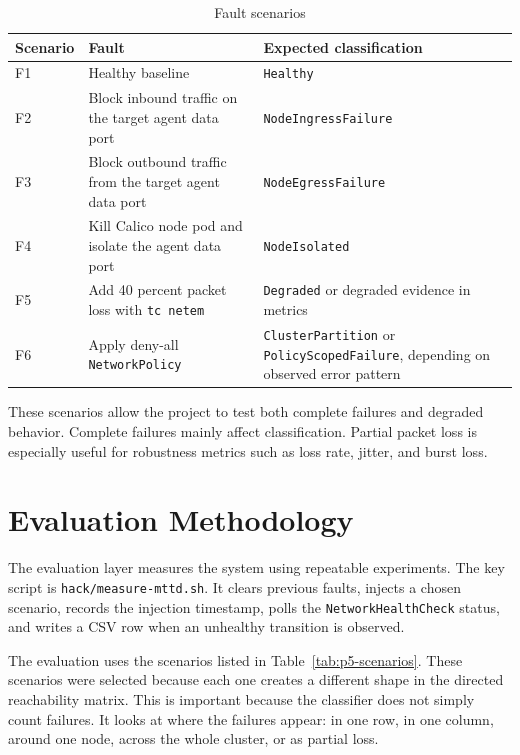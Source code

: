 \documentclass[11pt,a4paper]{article}
\newcommand{\code}[1]{\texttt{#1}}
\begin{document}
\begin{table}[h]
\centering
\caption{Fault scenarios}
\begin{tabularx}{\textwidth}{@{}lYY@{}}
\toprule
\textbf{Scenario} & \textbf{Fault} & \textbf{Expected classification} \\
\midrule
F1 & Healthy baseline & \code{Healthy} \\
F2 & Block inbound traffic on the target agent data port & \code{NodeIngressFailure} \\
F3 & Block outbound traffic from the target agent data port & \code{NodeEgressFailure} \\
F4 & Kill Calico node pod and isolate the agent data port & \code{NodeIsolated} \\
F5 & Add 40 percent packet loss with \code{tc netem} & \code{Degraded} or degraded evidence in metrics \\
F6 & Apply deny-all \code{NetworkPolicy} & \code{ClusterPartition} or \code{PolicyScopedFailure}, depending on observed error pattern \\
\bottomrule
\end{tabularx}
\end{table}

These scenarios allow the project to test both complete failures and degraded behavior. Complete failures mainly affect classification. Partial packet loss is especially useful for robustness metrics such as loss rate, jitter, and burst loss.

\section{Evaluation Methodology}

The evaluation layer measures the system using repeatable experiments. The key script is \code{hack/measure-mttd.sh}. It clears previous faults, injects a chosen scenario, records the injection timestamp, polls the \code{NetworkHealthCheck} status, and writes a CSV row when an unhealthy transition is observed.

The evaluation uses the scenarios listed in Table~\ref{tab:p5-scenarios}. These scenarios were selected because each one creates a different shape in the directed reachability matrix. This is important because the classifier does not simply count failures. It looks at where the failures appear: in one row, in one column, around one node, across the whole cluster, or as partial loss.
\end{document}

